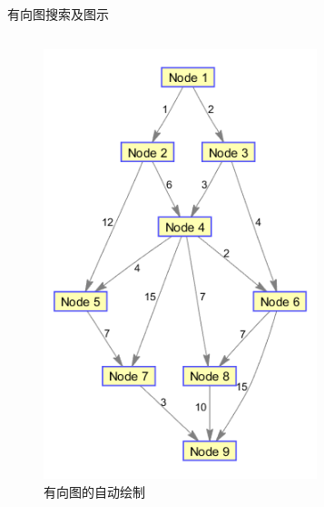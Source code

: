 \documentclass[10pt]{beamer}
\begin{document}
\begin{frame}[allowframebreaks]{有向图搜索及图示}



	\begin{columns}[T]
    \begin{figure}[htp]
      \centering
      \includegraphics[width = 0.9\textwidth]{71.png}
      \caption{有向图的自动绘制}
    \end{figure}


\end{columns}
\end{frame}
\end{document}
